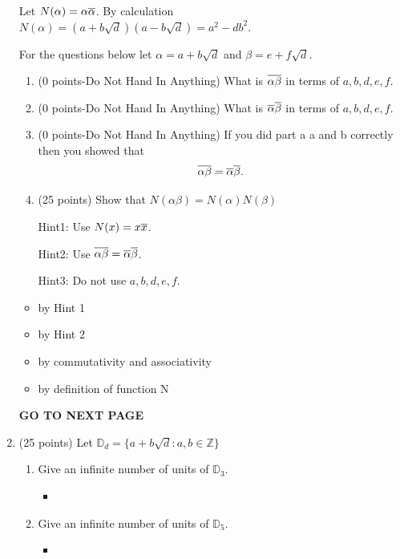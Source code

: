 \documentclass[12pt]{article}
\newcommand{\D}{{\mathbb D}}
\newcommand{\Z}{{\mathbb Z}}
\begin{document}
\begin{enumerate}
Let $N(\alpha)=\alpha\ov \alpha$. By calculation $N(\alpha)= (a+b\sqrt{d})(a-b\sqrt{d})=a^2-db^2.$

For the questions below let $\alpha=a+b\sqrt{d}$ and $\beta = e+f\sqrt{d}$. 

\begin{enumerate}
\item
(0 points-Do Not Hand In Anything)
What is $\ov{\alpha\beta}$ in terms of $a,b,d,e,f$. 
\item
(0 points-Do Not Hand In Anything)
What is $\ov \alpha \ov \beta $ in terms of $a,b,d,e,f$. 
\item
(0 points-Do Not Hand In Anything)
If you did part a a and b correctly then you showed that
$$\ov{\alpha\beta}=\ov \alpha  \ov \beta .$$

\item
(25 points) 
Show that $N(\alpha\beta)=N(\alpha)N(\beta)$

Hint1: Use $N(x)=x\ov x$. 

Hint2: Use $\ov{\alpha\beta}=\ov{\alpha}\ov{\beta}$. 

Hint3: Do not use $a,b,d,e,f$. 

\end{enumerate}

\begin{itemize}
    \item {} by Hint 1
    \item \boldmath{$\alpha\beta\ov{\alpha\beta} = \alpha\beta\ov\alpha\ov\beta$} by Hint 2
    \item \boldmath{$\alpha\beta\ov\alpha\ov\beta = \alpha\ov\alpha\beta\ov\beta$} by commutativity and associativity
    \item {} by definition of function N
\end{itemize}

\vfill

\centerline{\bf GO TO NEXT PAGE} 

\newpage


\item 
(25 points) 
Let $\D_d = \{ a+b\sqrt{d} \colon a,b\in\Z\}$

\begin{enumerate}
\item 
Give an infinite number of units of $\D_3$. 
\begin{itemize}
    \item \boldmath{$(2 + \sqrt3)^n for \, n \in \Z$}
\end{itemize}
\item 
Give an infinite number of units of $\D_5$. 
\begin{itemize}
    \item \boldmath{$(9 + 4\sqrt5)^n for \, n \in \Z$}
\end{itemize}


\end{enumerate}
\end{enumerate}
\end{document}
